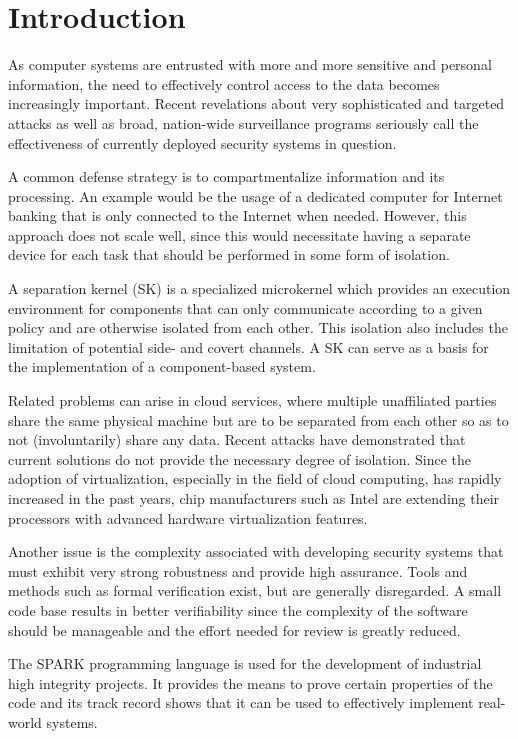 \chapter{Introduction}
As computer systems are entrusted with more and more sensitive and personal
information, the need to effectively control access to the data becomes
increasingly important. Recent revelations about very sophisticated and
targeted attacks as well as broad, nation-wide surveillance programs seriously
call the effectiveness of currently deployed security systems in question.

A common defense strategy is to compartmentalize information and its processing.
An example would be the usage of a dedicated computer for Internet banking that
is only connected to the Internet when needed. However, this approach does not
scale well, since this would necessitate having a separate device for each task
that should be performed in some form of isolation.

A separation kernel (SK) is a specialized
microkernel which provides an execution environment for
components that can only communicate according to a given policy and are
otherwise isolated from each other. This isolation also includes the limitation
of potential side- and covert channels. A SK can serve as a basis for the
implementation of a component-based system.

Related problems can arise in cloud services, where multiple unaffiliated parties
share the same physical machine but are to be separated from each other so as to
not (involuntarily) share any data. Recent attacks
\cite{Wu:2012:WHH:2362793.2362802} have demonstrated that current solutions do
not provide the necessary degree of isolation. Since the adoption of
virtualization, especially in the field of cloud
computing, has rapidly increased in the past years, chip manufacturers such as
Intel are extending their processors with advanced hardware virtualization
features.

Another issue is the complexity associated with developing security systems
that must exhibit very strong robustness and provide high
assurance. Tools and methods such as formal
verification exist, but are generally disregarded. A
small code base results in better verifiability since the complexity of the
software should be manageable and the effort needed for review is greatly
reduced.

The SPARK programming language is used for the development of
industrial high integrity projects. It provides the means to prove certain
properties of the code and its track record
\cite{Chapman:2000:IES:369264.369270} shows that it can be used to effectively
implement real-world systems.

